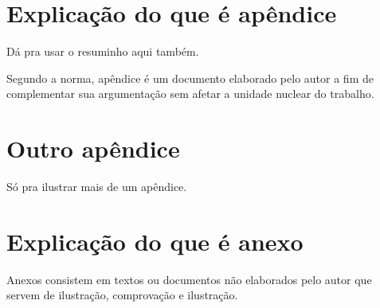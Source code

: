 \documentclass[quali]{mpit}
\begin{document}



\listofacronyms

\apendice

\chapter{Explicação do que é apêndice}

\begin{resumocap}
Dá pra usar o resuminho aqui também.
\end{resumocap}

Segundo a norma, apêndice é um documento elaborado pelo autor a fim de complementar sua argumentação sem afetar a unidade nuclear do trabalho.

\chapter{Outro apêndice}

Só pra ilustrar mais de um apêndice.

\anexo

\chapter{Explicação do que é anexo}

Anexos consistem em textos ou documentos não elaborados pelo autor que servem de ilustração, comprovação e ilustração.
\end{document}
